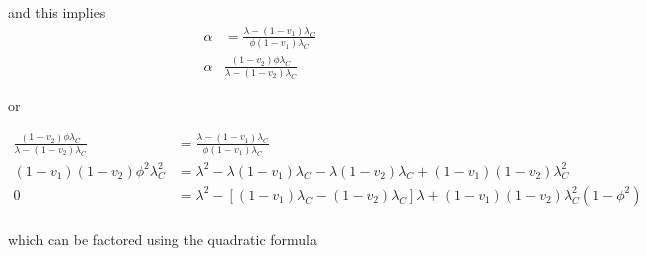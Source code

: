 \documentclass[12pt]{article}
\begin{document}
\noindent
and this implies
\begin{align}
    \alpha &= \frac{\lambda - (1-v_1) \lambda_C}{\phi (1-v_1) \lambda_C} \\
    \alpha & \frac{(1-v_2)\phi \lambda_C}{\lambda - (1-v_2) \lambda_C}
\end{align}

\noindent
or 

\begin{align}
    \frac{(1-v_2)\phi \lambda_C}{\lambda - (1-v_2) \lambda_C} &= \frac{\lambda - (1-v_1) \lambda_C}{\phi (1-v_1) \lambda_C} \\
    (1-v_1)(1-v_2)\phi^2 \lambda_C^2 &= \lambda^2 - \lambda(1-v_1)\lambda_C - \lambda(1-v_2)\lambda_C + (1-v_1)(1-v_2)\lambda_C^2 \\
    0 &= \lambda^2 -[(1-v_1)\lambda_C - (1-v_2)\lambda_C]\lambda + (1-v_1)(1-v_2)\lambda_C^2(1-\phi^2) \\
\end{align}

which can be factored using the quadratic formula 






\end{document}
